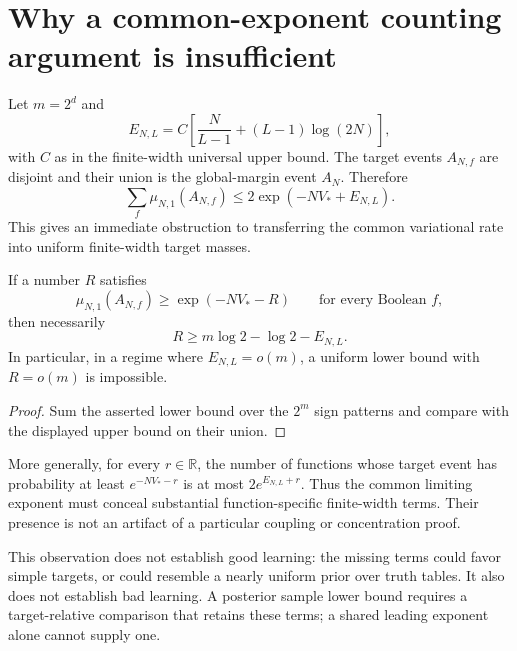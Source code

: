 \section{Why a common-exponent counting argument is insufficient}
\label{sec:critical-counting-obstruction}

Let $m=2^d$ and
\[
 E_{N,L}=C\left[\frac{N}{L-1}+(L-1)\log(2N)\right],
\]
with $C$ as in the finite-width universal upper bound. The target
events $A_{N,f}$ are disjoint and their union is the global-margin
event $A_N$. Therefore
\[
 \sum_f\mu_{N,1}(A_{N,f})
 \le 2\exp(-NV_*+E_{N,L}).
\]
This gives an immediate obstruction to transferring the common
variational rate into uniform finite-width target masses.

\begin{proposition}
If a number $R$ satisfies
\[
 \mu_{N,1}(A_{N,f})\ge\exp(-NV_*-R)
 \qquad\text{for every Boolean }f,
\]
then necessarily
\[
 R\ge m\log2-\log2-E_{N,L}.
\]
In particular, in a regime where $E_{N,L}=o(m)$, a uniform lower
bound with $R=o(m)$ is impossible.
\end{proposition}

\begin{proof}
Sum the asserted lower bound over the $2^m$ sign patterns and compare
with the displayed upper bound on their union.
\end{proof}

More generally, for every $r\in\mathbb R$, the number of functions
whose target event has probability at least $e^{-NV_*-r}$ is at most
$2 e^{E_{N,L}+r}$. Thus the common limiting exponent must conceal
substantial function-specific finite-width terms. Their presence is
not an artifact of a particular coupling or concentration proof.

This observation does not establish good learning: the missing terms
could favor simple targets, or could resemble a nearly uniform prior
over truth tables. It also does not establish bad learning. A posterior
sample lower bound requires a target-relative comparison that retains
these terms; a shared leading exponent alone cannot supply one.
